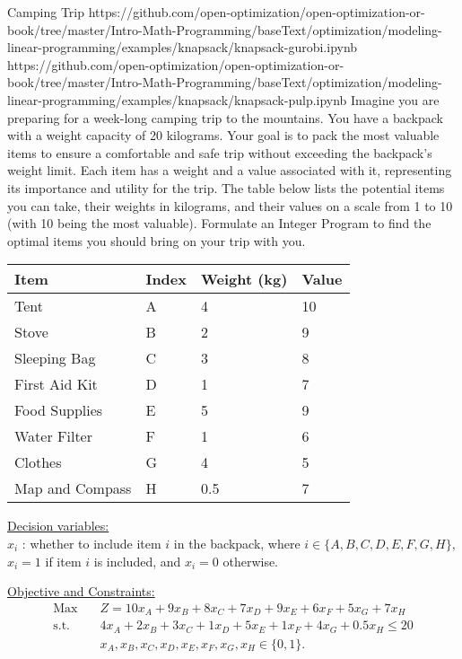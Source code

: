 \begin{examplewithallcode}{Camping Trip}
    {}
    {https://github.com/open-optimization/open-optimization-or-book/tree/master/Intro-Math-Programming/baseText/optimization/modeling-linear-programming/examples/knapsack/knapsack-gurobi.ipynb}
    {https://github.com/open-optimization/open-optimization-or-book/tree/master/Intro-Math-Programming/baseText/optimization/modeling-linear-programming/examples/knapsack/knapsack-pulp.ipynb}
    Imagine you are preparing for a week-long camping trip to the mountains. You have a backpack with a weight capacity of 20 kilograms. Your goal is to pack the most valuable items to ensure a comfortable and safe trip without exceeding the backpack's weight limit. Each item has a weight and a value associated with it, representing its importance and utility for the trip. The table below lists the potential items you can take, their weights in kilograms, and their values on a scale from 1 to 10 (with 10 being the most valuable).
    \newline
    Formulate an Integer Program to find the optimal items you should bring on your trip with you. 
    \end{examplewithallcode}
    
    \begin{table}[h!] \begin{center} \begin{tabular} {|l|l|l|l|} 
    \hline Item & Index & Weight (kg) & Value  \\ \hline
    \hline Tent & A & 4 & 10  \\
    \hline Stove & B & 2 & 9  \\
    \hline Sleeping Bag & C & 3 & 8  \\
    \hline First Aid Kit & D & 1 & 7  \\
    \hline Food Supplies & E & 5 & 9  \\
    \hline Water Filter & F & 1 & 6  \\
    \hline Clothes & G & 4 & 5  \\
    \hline Map and Compass & H & 0.5 & 7  \\
    \hline \end{tabular} \end{center} \end{table}
    
    \begin{solution}
    \underline{Decision variables:} \\
    $x_i$ : whether to include item $i$ in the backpack, where $i \in \{A, B, C, D, E, F, G, H\}$, $x_i = 1$ if item $i$ is included, and $x_i = 0$ otherwise.
    
    \smallskip \underline{Objective and Constraints:}
    \begin{align*}
    \mbox{Max~~ } & Z = 10x_A + 9x_B + 8x_C + 7x_D + 9x_E + 6x_F + 5x_G + 7x_H  \\
    \mbox{s.t.~~} & 4x_A + 2x_B + 3x_C + 1x_D + 5x_E + 1x_F + 4x_G + 0.5x_H \le 20 \\
    & x_A, x_B, x_C, x_D, x_E, x_F, x_G, x_H \in \{0,1\}.
    \end{align*}
    \end{solution}
    
